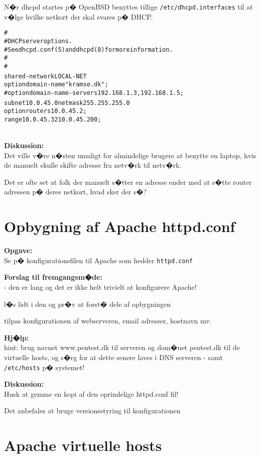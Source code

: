 \documentclass[a4paper,11pt,notitlepage]{oevelser}
\begin{document}
N�r dhcpd startes p� OpenBSD benyttes tillige \verb+/etc/dhcpd.interfaces+ til at v�lge
hvilke netkort der skal svares p� DHCP.

\begin{alltt}
#
# DHCP server options.
# See dhcpd.conf(5) and dhcpd(8) for more information.
#
#
shared-network LOCAL-NET {
        option  domain-name "kramse.dk";
        #option  domain-name-servers 192.168.1.3, 192.168.1.5;
        subnet 10.0.45.0 netmask 255.255.255.0 {
                option routers 10.0.45.2;
                range 10.0.45.32 10.0.45.200;
        }
}
\end{alltt}

{\bfseries Diskussion:}\\
Det ville v�re n�sten umuligt for almindelige brugere at benytte en laptop, hvis de manuelt skulle skifte adresse fra netv�rk til netv�rk.

Det er ofte set at folk der manuelt s�tter en adresse ender med at s�tte router adressen p� deres netkort, hvad sker der s�?




\chapter{Opbygning af Apache httpd.conf}
\label{ex:apache-httpd.conf}

{\bfseries Opgave:}\\
Se p� konfigurationsfilen til Apache som hedder \verb+httpd.conf+

{\bfseries Forslag til fremgangsm�de:}\\
- den er lang og det er ikke helt trivielt at konfigurere Apache!

l�s lidt i den og pr�v at forst� dele af opbygningen

tilpas konfigurationen af webserveren, email adresser, hostnavn mv.

{\bfseries Hj�lp:}\\
hint: brug navnet www.pentest.dk til serveren og dom�net pentest.dk
til de virtuelle hosts, og s�rg for at dette
senere laves i DNS serveren - samt \verb+/etc/hosts+ p� systemet!

{\bfseries Diskussion:}\\
Husk at gemme en kopi af den oprindelige httpd.conf fil!

Det anbefales at bruge versionsstyring til konfigurationen

\chapter{Apache virtuelle hosts}
\label{ex:apache-virtual}
\end{document}

